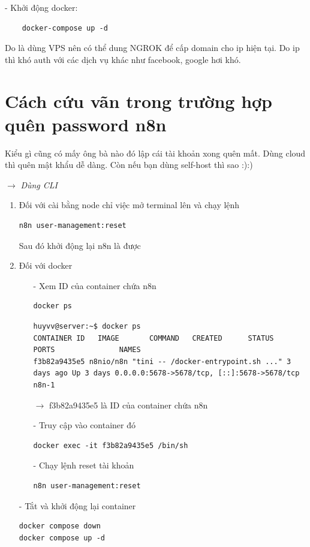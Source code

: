 - Khởi động docker: 

\begin{lstlisting}
    docker-compose up -d
\end{lstlisting}

Do là dùng VPS nên có thể dung NGROK để cấp domain cho ip hiện tại. Do ip thì khó auth với các dịch vụ khác như facebook, google hơi khó.

\section{Cách cứu vãn trong trường hợp quên password n8n}

Kiểu gì cũng có mấy ông bà nào đó lập cái tài khoản xong quên mất. Dùng cloud thì quên mật khẩu dễ dàng. Còn nếu bạn dùng self-host thì sao :):)

$\rightarrow$ \textit{Dùng CLI }

\begin{enumerate}
    \item Đối với cài bằng node chỉ việc mở terminal lên và chạy lệnh

\begin{lstlisting}[language = Bash]
n8n user-management:reset
\end{lstlisting}

Sau đó khởi động lại n8n là được

    \item Đối với docker

\begin{itemize}
    \item[-] Xem ID của container chứa n8n
\begin{lstlisting}
docker ps
\end{lstlisting}

\begin{lstlisting}
huyvv@server:~$ docker ps
CONTAINER ID   IMAGE       COMMAND   CREATED      STATUS      PORTS               NAMES
f3b82a9435e5 n8nio/n8n "tini -- /docker-entrypoint.sh ..." 3 days ago Up 3 days 0.0.0.0:5678->5678/tcp, [::]:5678->5678/tcp n8n-1
\end{lstlisting}


$\rightarrow$ f3b82a9435e5 là ID của container chứa n8n

\item[-] Truy cập vào container đó
\begin{lstlisting}
docker exec -it f3b82a9435e5 /bin/sh
\end{lstlisting}

\item[-] Chạy lệnh reset tài khoản
\begin{lstlisting}
n8n user-management:reset
\end{lstlisting}
\end{itemize}
\item[-] Tắt và khởi động lại container
\begin{lstlisting}
docker compose down
docker compose up -d
\end{lstlisting}
\end{enumerate}






